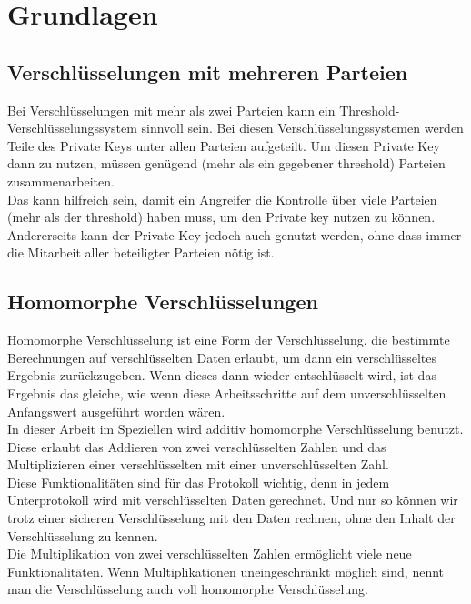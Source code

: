\chapter{Grundlagen}


\section{Verschlüsselungen mit mehreren Parteien}
Bei Verschlüsselungen mit mehr als zwei Parteien kann ein Threshold- Verschlüsselungssystem sinnvoll sein. Bei diesen Verschlüsselungssystemen werden Teile des Private Keys unter allen Parteien aufgeteilt. Um diesen Private Key dann zu nutzen, müssen genügend (mehr als ein gegebener threshold) Parteien zusammenarbeiten.\\
Das kann hilfreich sein, damit ein Angreifer die Kontrolle über viele Parteien (mehr als der threshold) haben muss, um den Private key nutzen zu können. Andererseits kann der Private Key jedoch auch genutzt werden, ohne dass immer die Mitarbeit aller beteiligter Parteien nötig ist.\\

\section{Homomorphe Verschlüsselungen}
Homomorphe Verschlüsselung \cite{Yi2014} ist eine Form der Verschlüsselung, die bestimmte Berechnungen auf verschlüsselten Daten erlaubt, um dann ein verschlüsseltes Ergebnis zurückzugeben. Wenn dieses dann wieder entschlüsselt wird, ist das Ergebnis das gleiche, wie wenn diese Arbeitsschritte auf dem unverschlüsselten Anfangswert ausgeführt worden wären.\\
In dieser Arbeit im Speziellen wird additiv homomorphe Verschlüsselung benutzt. Diese  erlaubt das Addieren von zwei verschlüsselten Zahlen und das Multiplizieren einer verschlüsselten mit einer unverschlüsselten Zahl.\\
Diese Funktionalitäten sind für das Protokoll wichtig, denn in jedem Unterprotokoll wird mit verschlüsselten Daten gerechnet. Und nur so können wir trotz einer sicheren Verschlüsselung mit den Daten rechnen, ohne den Inhalt der Verschlüsselung zu kennen.\\
Die Multiplikation von zwei verschlüsselten Zahlen ermöglicht viele neue Funktionalitäten. Wenn Multiplikationen uneingeschränkt möglich sind, nennt man die Verschlüsselung auch voll homomorphe Verschlüsselung.\\

